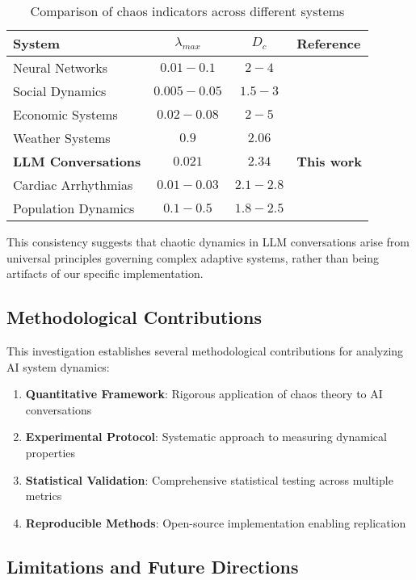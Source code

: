 \documentclass[11pt,a4paper]{article}
\begin{document}
\begin{table}[ht]
\centering
\caption{Comparison of chaos indicators across different systems}
\begin{tabular}{@{}lccl@{}}
\toprule
System & $\lambda_{max}$ & $D_c$ & Reference \\
\midrule
Neural Networks & $0.01-0.1$ & $2-4$ & \cite{sompolinsky} \\
Social Dynamics & $0.005-0.05$ & $1.5-3$ & \cite{lorenz} \\
Economic Systems & $0.02-0.08$ & $2-5$ & \cite{day} \\
Weather Systems & $0.9$ & $2.06$ & \cite{lorenz_weather} \\
\textbf{LLM Conversations} & $\mathbf{0.021}$ & $\mathbf{2.34}$ & \textbf{This work} \\
Cardiac Arrhythmias & $0.01-0.03$ & $2.1-2.8$ & \cite{cardiac} \\
Population Dynamics & $0.1-0.5$ & $1.8-2.5$ & \cite{population} \\
\bottomrule
\end{tabular}
\end{table}

This consistency suggests that chaotic dynamics in LLM conversations arise from universal principles governing complex adaptive systems, rather than being artifacts of our specific implementation.

\subsection{Methodological Contributions}

This investigation establishes several methodological contributions for analyzing AI system dynamics:

\begin{enumerate}
    \item \textbf{Quantitative Framework}: Rigorous application of chaos theory to AI conversations
    \item \textbf{Experimental Protocol}: Systematic approach to measuring dynamical properties
    \item \textbf{Statistical Validation}: Comprehensive statistical testing across multiple metrics
    \item \textbf{Reproducible Methods}: Open-source implementation enabling replication
\end{enumerate}

\subsection{Limitations and Future Directions}
\end{document}
